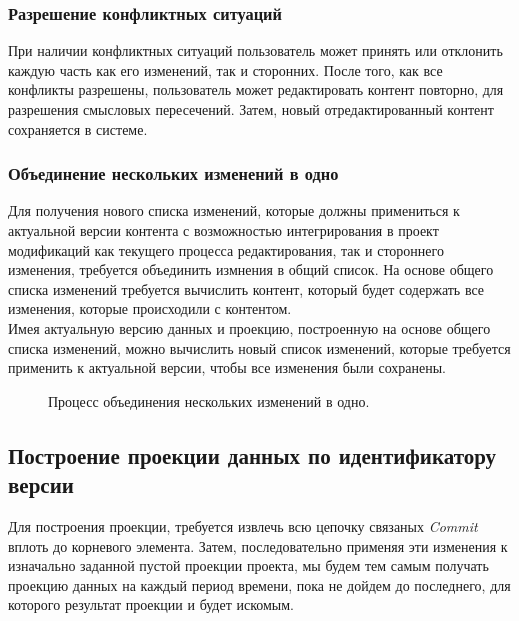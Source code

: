 \documentclass[a4paper,14pt]{extreport} %
\begin{document}
\subsubsection{Разрешение конфликтных ситуаций}

При наличии конфликтных ситуаций пользователь может принять или отклонить каждую часть как его изменений, так и сторонних.
После того, как все конфликты разрешены, пользователь может редактировать контент повторно, для разрешения смысловых пересечений. Затем, новый отредактированный контент сохраняется в системе.

\newpage
\subsubsection{Объединение нескольких изменений в одно}

Для получения нового списка изменений, которые должны примениться к актуальной версии контента с возможностью интегрирования в проект модификаций как текущего процесса редактирования, так и стороннего изменения, требуется объединить измнения в общий список. На основе общего списка изменений требуется вычислить контент, который будет содержать все изменения, которые происходили с контентом. \\
Имея актуальную версию данных и проекцию, построенную на основе общего списка изменений, можно вычислить новый список изменений, которые требуется применить к актуальной версии, чтобы все изменения были сохранены.

\begin{figure}[H]
\caption{Процесс объединения нескольких изменений в одно.}
\label{check-conflicts-process}
\end{figure}

\newpage
\subsection{Построение проекции данных по идентификатору версии}
Для построения проекции, требуется извлечь всю цепочку связаных \textit{Commit} вплоть до корневого элемента. Затем, последовательно применяя эти изменения к изначально заданной пустой проекции проекта, мы будем тем самым получать проекцию данных на каждый период времени, пока не дойдем до последнего, для которого результат проекции и будет искомым.
\end{document}
